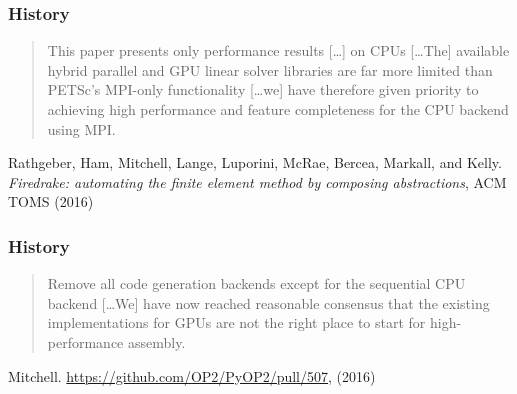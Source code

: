 \documentclass[aspectratio=169]{beamer}
\begin{document}
\begin{frame}
  \frametitle{History}
  \begin{quote}
    This paper presents only performance results [\dots] on CPUs
    [\dots The] available hybrid parallel and GPU linear solver
    libraries are far more limited than PETSc’s MPI-only functionality
    [\dots we] have therefore given priority to achieving high
    performance and feature completeness for the CPU backend using
    MPI.\@
  \end{quote}
  \pause
  {
    \scriptsize
    \raggedleft
    Rathgeber, Ham, Mitchell, Lange, Luporini, McRae, Bercea, Markall,
    and Kelly. \emph{Firedrake: automating the finite element method
      by composing abstractions}, ACM TOMS (2016) \nocite{Rathgeber:2016}
    \par
  }
\end{frame}

\begin{frame}
  \frametitle{History}
  \begin{quote}
    Remove all code generation backends except for the sequential CPU
    backend [\dots We]
    have now reached reasonable consensus that the existing
    implementations for GPUs are not the right place to start for
    high-performance assembly.
  \end{quote}
  \pause
  {
    \scriptsize
    \raggedleft
    Mitchell. \url{https://github.com/OP2/PyOP2/pull/507}, (2016)
    \par
  }
\end{frame}
\end{document}
